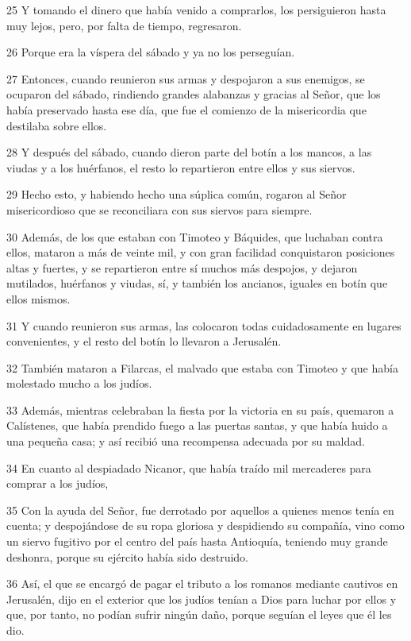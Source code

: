 \par 25 Y tomando el dinero que había venido a comprarlos, los persiguieron hasta muy lejos, pero, por falta de tiempo, regresaron.
\par 26 Porque era la víspera del sábado y ya no los perseguían.
\par 27 Entonces, cuando reunieron sus armas y despojaron a sus enemigos, se ocuparon del sábado, rindiendo grandes alabanzas y gracias al Señor, que los había preservado hasta ese día, que fue el comienzo de la misericordia que destilaba sobre ellos.
\par 28 Y después del sábado, cuando dieron parte del botín a los mancos, a las viudas y a los huérfanos, el resto lo repartieron entre ellos y sus siervos.
\par 29 Hecho esto, y habiendo hecho una súplica común, rogaron al Señor misericordioso que se reconciliara con sus siervos para siempre.
\par 30 Además, de los que estaban con Timoteo y Báquides, que luchaban contra ellos, mataron a más de veinte mil, y con gran facilidad conquistaron posiciones altas y fuertes, y se repartieron entre sí muchos más despojos, y dejaron mutilados, huérfanos y viudas, sí, y también los ancianos, iguales en botín que ellos mismos.
\par 31 Y cuando reunieron sus armas, las colocaron todas cuidadosamente en lugares convenientes, y el resto del botín lo llevaron a Jerusalén.
\par 32 También mataron a Filarcas, el malvado que estaba con Timoteo y que había molestado mucho a los judíos.
\par 33 Además, mientras celebraban la fiesta por la victoria en su país, quemaron a Calístenes, que había prendido fuego a las puertas santas, y que había huido a una pequeña casa; y así recibió una recompensa adecuada por su maldad.
\par 34 En cuanto al despiadado Nicanor, que había traído mil mercaderes para comprar a los judíos,
\par 35 Con la ayuda del Señor, fue derrotado por aquellos a quienes menos tenía en cuenta; y despojándose de su ropa gloriosa y despidiendo su compañía, vino como un siervo fugitivo por el centro del país hasta Antioquía, teniendo muy grande deshonra, porque su ejército había sido destruido.
\par 36 Así, el que se encargó de pagar el tributo a los romanos mediante cautivos en Jerusalén, dijo en el exterior que los judíos tenían a Dios para luchar por ellos y que, por tanto, no podían sufrir ningún daño, porque seguían el leyes que él les dio.

